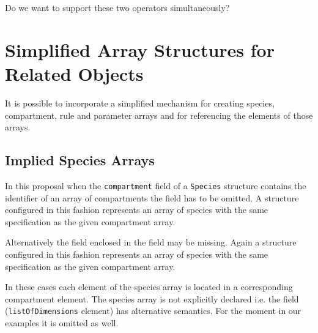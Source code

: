 \documentclass{cekarticle}
\begin{document}
Do we want to support these two operators simultaneously? 

\section{Simplified Array Structures for Related Objects}

It is possible to incorporate a simplified mechanism for creating
species, compartment, rule and parameter arrays and for referencing the
elements of those arrays.

\subsection{Implied Species Arrays}
\label{sec:impliedarrays}

In this proposal when the \texttt{compartment} field of a
\texttt{Species} structure contains the identifier of an array of
compartments the  field has to be omitted.
A structure configured in this fashion
represents an array of species with the same specification as the
given compartment array.

Alternatively the  field enclosed in the  field
may be missing.  Again a structure configured in this fashion
represents an array of species with the same specification as the
given compartment array.

In these cases each element of the species array is
located in a corresponding compartment element.  The species array
is not explicitly declared i.e. the  field (\texttt{listOfDimensions} element)
has alternative semantics.  For the moment in our examples it is omitted as well.
\end{document}
